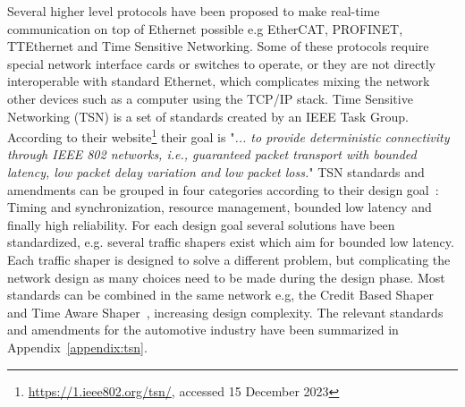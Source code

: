 Several higher level protocols have been proposed to make real-time communication on top of Ethernet possible e.g EtherCAT, PROFINET, TTEthernet and Time Sensitive Networking. Some of these protocols require special network interface cards or switches to operate, or they are not directly interoperable with standard Ethernet, which complicates mixing the network other devices such as a computer using the TCP/IP stack. Time Sensitive Networking (TSN) is a set of standards created by an IEEE Task Group. According to their website\footnote{\url{https://1.ieee802.org/tsn/}, accessed 15 December 2023} their goal is "\textit{... to provide deterministic connectivity through IEEE 802 networks, i.e., guaranteed packet transport with bounded latency, low packet delay variation and low packet loss.}" TSN standards and amendments can be grouped in four categories according to their design goal~\cite{ashjaei2021time}: Timing and synchronization, resource management, bounded low latency and finally high reliability. For each design goal several solutions have been standardized, e.g. several traffic shapers exist which aim for bounded low latency. Each traffic shaper is designed to solve a different problem, but complicating the network design as many choices need to be made during the design phase. Most standards can be combined in the same network e.g, the Credit Based Shaper~\cite{IEEE8021Qav} and Time Aware Shaper~\cite{IEEE8021Qbv}, increasing design complexity. The relevant standards and amendments for the automotive industry have been summarized in Appendix~\ref{appendix:tsn}.